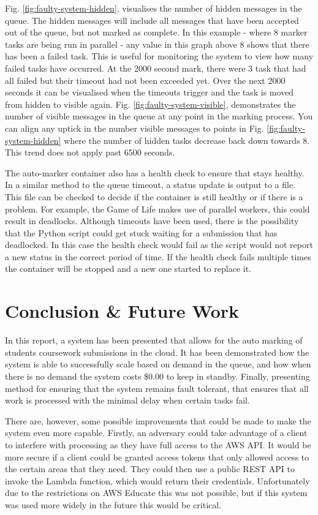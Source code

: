 \documentclass[runningheads]{llncs}
\begin{document}
Fig. \ref{fig:faulty-system-hidden}, visualises the number of hidden messages in the queue. The hidden messages will include all messages that have been accepted out of the queue, but not marked as complete. In this example - where 8 marker tasks are being run in parallel - any value in this graph above 8 shows that there has been a failed task. This is useful for monitoring the system to view how many failed tasks have occurred. At the 2000 second mark, there were 3 task that had all failed but their timeout had not been exceeded yet. Over the next 2000 seconds it can be visualised when the timeouts trigger and the task is moved from hidden to visible again. Fig. \ref{fig:faulty-system-visible}, demonstrates the number of visible messages in the queue at any point in the marking process. You can align any uptick in the number visible messages to points in Fig. \ref{fig:faulty-system-hidden} where the number of hidden tasks decrease back down towards 8. This trend does not apply past 6500 seconds.

The auto-marker container also has a health check to ensure that stays healthy. In a similar method to the queue timeout, a status update is output to a file. This file can be checked to decide if the container is still healthy or if there is a problem. For example, the Game of Life makes use of parallel workers, this could result in deadlocks. Although timeouts have been used, there is the possibility that the Python script could get stuck waiting for a submission that has deadlocked. In this case the health check would fail as the script would not report a new status in the correct period of time. If the health check fails multiple times the container will be stopped and a new one started to replace it. 


\section{Conclusion \& Future Work}
In this report, a system has been presented that allows for the auto marking of students coursework submissions in the cloud. It has been demonstrated how the system is able to successfully scale based on demand in the queue, and how when there is no demand the system costs \$0.00 to keep in standby. Finally, presenting method for ensuring that the system remains fault tolerant, that ensures that all work is processed with the minimal delay when certain tasks fail.

There are, however, some possible improvements that could be made to make the system even more capable. Firstly, an adversary could take advantage of a client to interfere with processing as they have full access to the AWS API. It would be more secure if a client could be granted access tokens that only allowed access to the certain areas that they need. They could then use a public REST API to invoke the Lambda function, which would return their credentials. Unfortunately due to the restrictions on AWS Educate this was not possible, but if this system was used more widely in the future this would be critical. 
\end{document}
